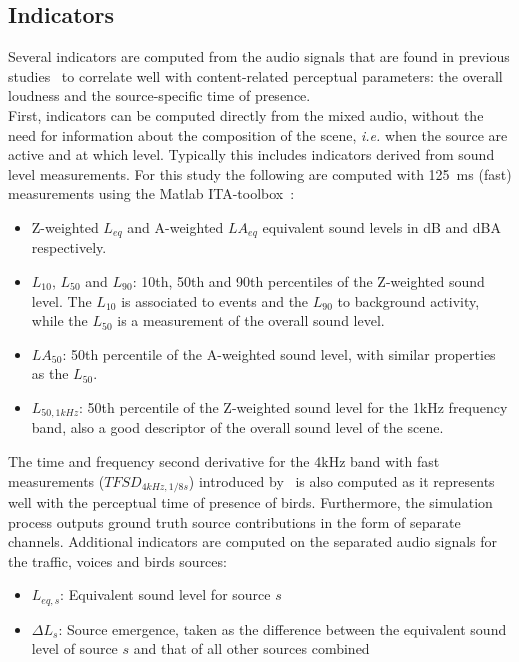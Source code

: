 \documentclass[11pt,a4paper]{article}
\begin{document}
\subsection{Indicators}
\label{sec:phys_inds}

Several indicators are computed from the audio signals that are found in previous studies~\cite{aumond2017, gontier2018} to correlate well with content-related perceptual parameters: the overall loudness and the source-specific time of presence.\\

First, indicators can be computed directly from the mixed audio, without the need for information about the composition of the scene, \textit{i.e.} when the source are active and at which level. Typically this includes indicators derived from sound level measurements. For this study the following are computed with 125~ms (fast) measurements using the Matlab ITA-toolbox~\cite{itatoolbox2017}:

\begin{itemize}
\item Z-weighted $L_{eq}$ and A-weighted $LA_{eq}$ equivalent sound levels in dB and dBA respectively.
\item $L_{10}$, $L_{50}$ and $L_{90}$: 10th, 50th and 90th percentiles of the Z-weighted sound level. The $L_{10}$ is associated to events and the $L_{90}$ to background activity, while the $L_{50}$ is a measurement of the overall sound level.
\item $LA_{50}$: 50th percentile of the A-weighted sound level, with similar properties as the $L_{50}$.
\item $L_{50, 1kHz}$: 50th percentile of the Z-weighted sound level for the 1kHz frequency band, also a good descriptor of the overall sound level of the scene.
\end{itemize}

The time and frequency second derivative for the 4kHz band with fast measurements ($TFSD_{4kHz, 1/8s}$) introduced by~\cite{aumond2017} is also computed as it represents well with the perceptual time of presence of birds. Furthermore, the simulation process outputs ground truth source contributions in the form of separate channels. Additional indicators are computed on the separated audio signals for the traffic, voices and birds sources:

\begin{itemize}
\item $L_{eq, s}$: Equivalent sound level for source $s$
\item $\Delta L_{s}$: Source emergence, taken as the difference between the equivalent sound level of source $s$ and that of all other sources combined
\end{itemize}
\end{document}
